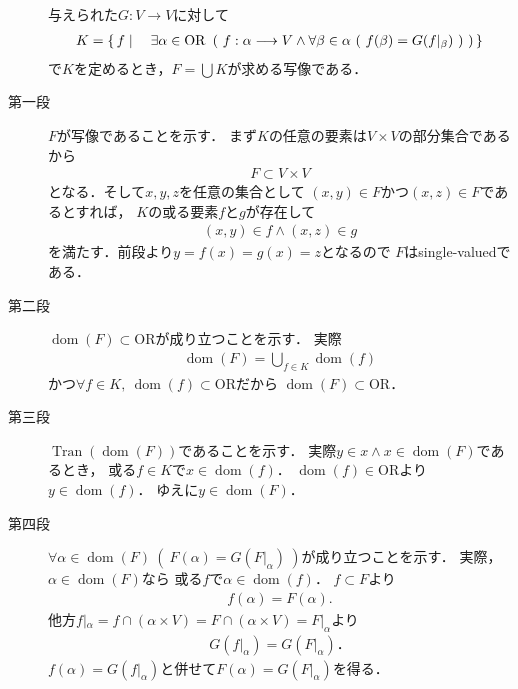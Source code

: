	\begin{prf}\mbox{}
		\begin{description}
			\item[] 与えられた$G:V \longrightarrow V$に対して
				\begin{align}
					K = \Set{f}{\exists \alpha \in \mathrm{OR}\ \left(\ f:\alpha \longrightarrow V \wedge \forall \beta \in \alpha\ (\ f(\beta) = G(f|_\beta)\ )\ \right)}
				\end{align}
				で$K$を定めるとき，$F = \bigcup K$が求める写像である．
				
			\item[第一段] $F$が写像であることを示す．
				まず$K$の任意の要素は$V \times V$の部分集合であるから
				\begin{align}
					F \subset V \times V
				\end{align}
				となる．そして$x,y,z$を任意の集合として
				$(x,y) \in F$かつ$(x,z) \in F$であるとすれば，
				$K$の或る要素$f$と$g$が存在して
				\begin{align}
					(x,y) \in f \wedge (x,z) \in g
				\end{align}
				を満たす．前段より$y = f(x) = g(x) = z$となるので
				$F$はsingle-valuedである．
			
			\item[第二段] $\operatorname{dom}(F) \subset \mathrm{OR}$が成り立つことを示す．
				実際
				\begin{align}
					\operatorname{dom}(F) = \bigcup_{f \in K} \operatorname{dom}(f)
				\end{align}
				かつ$\forall f \in K,\ \operatorname{dom}(f) \subset \mathrm{OR}$だから
				$\operatorname{dom}(F) \subset \mathrm{OR}$．
				
			\item[第三段] $\operatorname{Tran}(\operatorname{dom}(F))$であることを示す．
				実際$y \in x \wedge x \in \operatorname{dom}(F)$であるとき，
				或る$f \in K$で$x \in \operatorname{dom}(f)$．
				$\operatorname{dom}(f) \in \mathrm{OR}$より
				$y \in \operatorname{dom}(f)$．
				ゆえに$y \in \operatorname{dom}(F)$．
				
			\item[第四段] $\forall \alpha \in \operatorname{dom}(F)\ (\ F(\alpha) = G(F|_\alpha)\ )$が成り立つことを示す．
				実際，$\alpha \in \operatorname*{dom}(F)$なら
				或る$f$で$\alpha \in \operatorname*{dom}(f)$．
				$f \subset F$より
				\begin{align}
					f(\alpha) = F(\alpha).
				\end{align}
				他方$f|_\alpha = f \cap (\alpha \times V)
				= F \cap (\alpha \times V) = F|_\alpha$より
				\begin{align}
					G(f|_\alpha) = G(F|_\alpha)．
				\end{align}
				$f(\alpha) = G(f|_\alpha)$と併せて$F(\alpha) = G(F|_\alpha)$を得る．
			

\end{description}
\end{prf}
